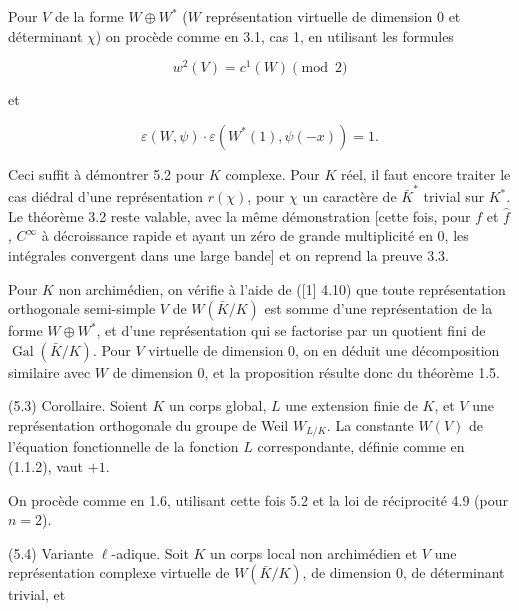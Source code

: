 \documentclass[9pt,twoside]{extarticle}
\begin{document}
{Pour \(V\) de la forme \(W\oplus W^*\) (\(W\) représentation virtuelle de dimension 0 et déterminant \(\chi\)) on procède comme en 3.1, cas 1, en utilisant les formules\par

\[
w^2(V)=c^1(W)\pmod2
\]

et\par

\[
\varepsilon(W,\psi)\cdot\varepsilon(W^*(1),\psi(-x))=1.
\]

Ceci suffit à démontrer 5.2 pour \(K\) complexe. Pour \(K\) réel, il faut encore traiter le cas diédral d’une représentation \(r(\chi)\), pour \(\chi\) un caractère de \(\bar K^*\) trivial sur \(K^*\). Le théorème 3.2 reste valable, avec la même démonstration [cette fois, pour \(f\) et \(\hat f\), \(C^\infty\) à décroissance rapide et ayant un zéro de grande multiplicité en 0, les intégrales convergent dans une large bande] et on reprend la preuve 3.3.\par

Pour \(K\) non archimédien, on vérifie à l’aide de ([1] 4.10) que toute représentation orthogonale semi-simple \(V\) de \(W(\bar K/K)\) est somme d’une représentation de la forme \(W\oplus W^*\), et d’une représentation qui se factorise par un quotient fini de \(\operatorname{Gal}(\bar K/K)\). Pour \(V\) virtuelle de dimension 0, on en déduit une décomposition similaire avec \(W\) de dimension 0, et la proposition résulte donc du théorème 1.5.\par

(5.3) Corollaire. Soient \(K\) un corps global, \(L\) une extension finie de \(K\), et \(V\) une représentation orthogonale du groupe de Weil \(W_{L/K}\). La constante \(W(V)\) de l’équation fonctionnelle de la fonction \(L\) correspondante, définie comme en (1.1.2), vaut \(+1\).\par

On procède comme en 1.6, utilisant cette fois 5.2 et la loi de réciprocité 4.9 (pour \(n=2\)).\par

(5.4) Variante \(\ell\)-adique. Soit \(K\) un corps local non archimédien et \(V\) une représentation complexe virtuelle de \(W(\bar K/K)\), de dimension 0, de déterminant trivial, et\par
}
\end{document}
